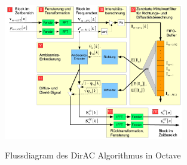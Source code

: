 \begin{figure}[!ht]
  \centering
  \includegraphics[width=0.7\textwidth]{implementierung/plots/flow.png}
  \label{fig:flow}
  \caption{Flussdiagram des DirAC Algorithmus in Octave\protect\footnotemark}
\end{figure}

